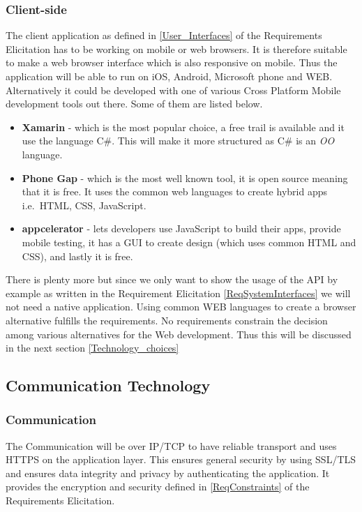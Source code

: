 \documentclass[a4paper,11pt]{article}
\begin{document}
\subsubsection{Client-side}
\noindent The client application as defined in \ref{User_Interfaces} of the Requirements Elicitation has to be working on mobile or web browsers. It is therefore suitable to make a web browser interface which is also responsive on mobile. Thus the application will be able to run on iOS, Android, Microsoft phone and WEB. Alternatively it could be developed with one of various Cross Platform Mobile development tools out there. Some of them are listed below.

\begin{itemize}
\item
  \textbf{Xamarin} - which is the most popular choice, a free trail is
  available and it use the language C\#. This will make it more
  structured as C\# is an \emph{OO} language.
\item
  \textbf{Phone Gap} - which is the most well known tool, it is open
  source meaning that it is free. It uses the common web languages to
  create hybrid apps i.e.~HTML, CSS, JavaScript.
\item
  \textbf{appcelerator} - lets developers use JavaScript to build their
  apps, provide mobile testing, it has a GUI to create design (which
  uses common HTML and CSS), and lastly it is free.
\end{itemize}

\noindent There is plenty more but since we only want to show the usage of the API by example as written in the Requirement Elicitation \ref{ReqSystemInterfaces} we will not need a native application. Using common WEB languages to create a browser alternative fulfills the requirements. No requirements constrain the decision among various alternatives for the Web development. Thus this will be discussed in the next section \ref{Technology_choices}

\subsection{Communication Technology}

\subsubsection{Communication}
The Communication will be over IP/TCP to have reliable transport and uses HTTPS on the application layer. This ensures general security by using SSL/TLS and ensures data integrity and privacy by authenticating the application. It provides the encryption and security defined in \ref{ReqConstraints} of the Requirements Elicitation.
\end{document}
